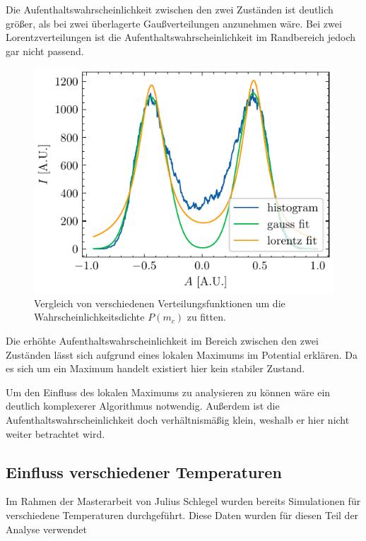 \documentclass[main.tex]{subfiles}
\begin{document}
Die Aufenthaltswahrscheinlichkeit zwischen den zwei Zuständen ist deutlich größer, als bei zwei überlagerte Gaußverteilungen anzunehmen wäre. Bei zwei Lorentzverteilungen ist die Aufenthaltswahrscheinlichkeit im Randbereich jedoch gar nicht passend.
\begin{figure}[H]
    \centering
    \includegraphics{bilder/plots/theo-vis/hist_fit_comp.pdf}
    \caption{Vergleich von verschiedenen Verteilungsfunktionen um die Wahrscheinlichkeitsdichte $P(m_c)$ zu fitten.}\label{fig:fit_func_comp}
\end{figure}

Die erhöhte Aufenthaltswahrscheinlichkeit im Bereich zwischen den zwei Zuständen lässt sich aufgrund eines lokalen Maximums im Potential erklären. Da es sich um ein Maximum handelt existiert hier kein stabiler Zustand.

Um den Einfluss des lokalen Maximums zu analysieren zu können wäre ein deutlich komplexerer Algorithmus notwendig. Außerdem ist die Aufenthaltswahrscheinlichkeit doch verhältnismäßig klein, weshalb er hier nicht weiter betrachtet wird.

\subsection{Einfluss verschiedener Temperaturen}


Im Rahmen der Masterarbeit von Julius Schlegel \cite{schlegel-master} wurden bereits Simulationen für verschiedene Temperaturen durchgeführt. Diese Daten wurden für diesen Teil der Analyse verwendet
\end{document}
